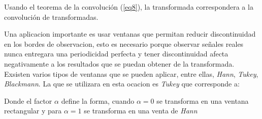 
\newp Usando el teorema de la convoluci\'on (\ref{eq8}), la transformada correspondera a la convoluci\'on de transformadas.

\insertequation[\label{eq15}]{\FF[q_{obs}(t)] = \FF[g(t)] * \FF[W(t)]}

\newp Una aplicacion importante es usar ventanas que permitan reducir discontinuidad en los bordes de observacion, esto es necesario porque observar señales reales nunca entregara una periodicidad perfecta y tener discontinuidad afecta negativamente a los resultados que se puedan obtener de la transformada. Exsisten varios tipos de ventanas que se pueden aplicar, entre ellas, \textit{Hann}, \textit{Tukey}, \textit{Blackmann}. La que se utilizara en esta ocacion es \textit{Tukey} que corresponde a:


\newp Donde el factor $\alpha$ define la forma, cuando $\alpha=0$ se transforma en una ventana rectangular y para $\alpha=1$ se transforma en una venta de \textit{Hann}






 
		
